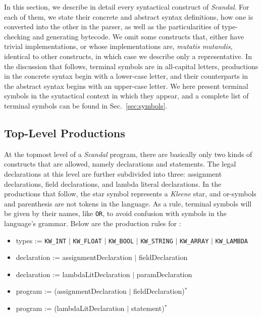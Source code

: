 In this section, we describe in detail every syntactical construct of \emph{Scandal}. For each of them, we state their concrete and abstract syntax definitions, how one is converted into the other in the parser, as well as the particularities of type-checking and generating bytecode. We omit some constructs that, either have trivial implementations, or whose implementations are, \emph{mutatis mutandis}, identical to other constructs, in which case we describe only a representative. In the discussion that follows, terminal symbols are in all-capital letters, productions in the concrete syntax begin with a lower-case letter, and their counterparts in the abstract syntax begins with an upper-case letter. We here present terminal symbols in the syntactical context in which they appear, and a complete list of terminal symbols can be found in Sec.~\ref{sec:symbols}.

\subsection{Top-Level Productions}

At the topmost level of a \emph{Scandal} program, there are basically only two kinds of constructs that are allowed, namely declarations and statements. The legal declarations at this level are further subdivided into three: assignment declarations, field declarations, and lambda literal declarations. In the productions that follow, the star symbol represents a \emph{Kleene} star, and or-symbols and parenthesis are not tokens in the language. As a rule, terminal symbols will be given by their names, like \texttt{OR}, to avoid confusion with symbols in the language's grammar. Below are the production rules for :

\begin{itemize}
	\item types := \texttt{KW\_INT} $|$ \texttt{KW\_FLOAT} $|$ \texttt{KW\_BOOL} $|$ \texttt{KW\_STRING} $|$ \texttt{KW\_ARRAY} $|$ \texttt{KW\_LAMBDA}
	\item declaration := assignmentDeclaration $|$ fieldDeclaration
	\item declaration := lambdaLitDeclaration $|$ paramDeclaration
	\item program := (assignmentDeclaration $|$ fieldDeclaration)$^*$
	\item program := (lambdaLitDeclaration $|$ statement)$^*$
\end{itemize}


